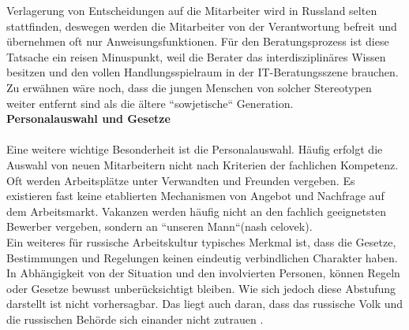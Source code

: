 	Verlagerung von Entscheidungen auf die Mitarbeiter wird in Russland selten stattfinden, deswegen werden die Mitarbeiter von der Verantwortung befreit und übernehmen oft nur Anweisungsfunktionen. Für  den Beratungsprozess ist diese Tatsache ein reisen Minuspunkt, weil die Berater das interdisziplinäres Wissen besitzen und  den vollen Handlungsspielraum in der IT-Beratungsszene brauchen.
	Zu erwähnen wäre noch, dass die jungen Menschen von solcher Stereotypen weiter entfernt sind als die ältere ``sowjetische`` Generation. \\

	\textbf{Personalauswahl und Gesetze}\\
	\\
	 Eine weitere wichtige Besonderheit ist die Personalauswahl. Häufig erfolgt die Auswahl von neuen Mitarbeitern nicht nach Kriterien der fachlichen Kompetenz. Oft werden Arbeitsplätze unter Verwandten und 
	 Freunden vergeben. Es existieren fast keine etablierten Mechanismen von Angebot und Nachfrage auf dem Arbeitsmarkt. Vakanzen werden häufig nicht an den fachlich geeignetsten Bewerber vergeben, sondern an ``unseren Mann``(nash celovek).\\
	 Ein weiteres für russische Arbeitskultur typisches Merkmal ist, dass die Gesetze, Bestimmungen und Regelungen keinen eindeutig verbindlichen Charakter haben. In Abhängigkeit von der Situation und den involvierten Personen, können Regeln oder Gesetze bewusst unberücksichtigt bleiben. Wie sich jedoch diese Abstufung darstellt ist nicht vorhersagbar. Das liegt auch daran, dass das russische Volk und die russischen Behörde sich einander nicht zutrauen \cite{ProzessbeglBerRU}.
 
